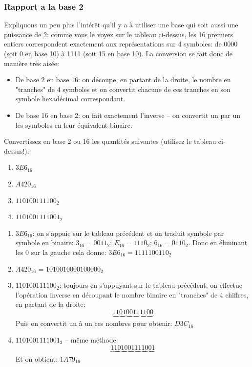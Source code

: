 \documentclass[12pt]{article}
\newenvironment{MaReponse}
		{\begin{greyedtextbox}\itshape} %
		{\end{greyedtextbox}}            %
\newenvironment{alphenum}
{\begin{enumerate}[label=\alph*.]}
	{\end{enumerate}}
\begin{document}
	 \subsubsection*{Rapport a la base 2}
	 Expliquons un peu plus l'intérêt qu'il y a à utiliser une base qui soit aussi une puissance de 2: comme vous le voyez sur le tableau ci-dessus, les 16 premiers entiers correspondent exactement aux représentations sur 4 symboles: de 0000 (soit 0 en base 10) à 1111 (soit 15 en base 10). La conversion se fait donc de manière très aisée:
	 \begin{itemize}
	 	\item De base 2 en base 16: on découpe, en partant de la droite, le nombre en "tranches" de 4 symboles et on convertit chacune de ces tranches en son symbole hexadécimal correspondant.
	 	\item De base 16 en base 2: on fait exactement l'inverse -- on convertit un par un les symboles en leur équivalent binaire.
	 \end{itemize}
	 \begin{MonExo}
	 	Convertissez en base 2 ou 16 les quantités suivantes (utilisez le tableau ci-dessus!):
	 	\begin{alphenum}
	 		\item $3E6_{16}$
	 		\item $A420_{16}$
	 		\item $110100111100_2$
	 		\item $1101001111001_2$
	 	\end{alphenum}
	 \end{MonExo}
	 \begin{MaReponse}
		\begin{alphenum}
			\item $3E6_{16}$: on s'appuie sur le tableau précédent et on traduit symbole par symbole en binaire: $3_{16} = 0011_2$;  $E_{16} = 1110_2$; $6_{16} = 0110_2$. Donc en éliminant les 0 sur la gauche cela donne: $3E6_{16} = 1111100110_2$
			\item $A420_{16}$ = $101	0010000100000_2$
			\item $110100111100_2$: toujours en s'appuyant sur le tableau précédent, on effectue l'opération inverse en découpant le nombre binaire en "tranches" de 4 chiffres, en partant de la droite:
			\[ \underbrace{1101}_{}\underbrace{0011}_{}\underbrace{1100}_{}\]
			Puis on convertit un à un ces nombres pour obtenir: $D3C_{16}$
			
			\item $1101001111001_2$ -- même méthode:
			\[ \underbrace{1}_{}\underbrace{1010}_{}\underbrace{0111}_{}\underbrace{1001}_{}\]
			Et on obtient: $1A79_{16}$
		\end{alphenum}
	\end{MaReponse}
	 
\end{document}
